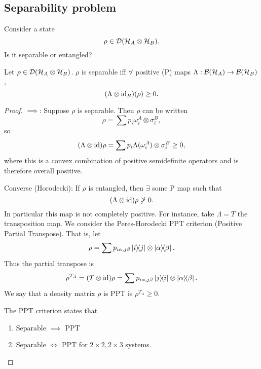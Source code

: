 \subsection*{Separability problem} 
Consider a state
\begin{equation*}
    \rho \in \mathcal{D}(\mathcal H_A\otimes \mathcal H_B).
\end{equation*}
Is it separable or entangled?
\begin{thm}\label{separabilitycriterion}
    Let $\rho \in \mathcal{D}(\mathcal H_A \otimes \mathcal H_B)$. $\rho$ is separable iff $\forall$ positive (P) maps $\Lambda:\mathcal{B}(\mathcal H_A)\to \mathcal{B}(\mathcal H_B)$,
    \begin{equation}
        (\Lambda \otimes \operatorname{id}_B)(\rho)\geq 0.
    \end{equation}
\end{thm}
\begin{proof}
    $\implies$: Suppose $\rho$ is separable. Then $\rho$ can be written
    \begin{equation}
        \rho=\sum p_i \omega_i^A \otimes \sigma_i^B,
    \end{equation}
    so
    \begin{equation}
        (\Lambda \otimes \operatorname{id})\rho = \sum p_i \Lambda(\omega_i^A) \otimes \sigma_i^B \geq 0,
    \end{equation}
    where this is a convex combination of positive semidefinite operators and is therefore overall positive.
    
    Converse (Horodecki): If $\rho$ is entangled, then $\exists$ some P map such that
    \begin{equation}
        (\Lambda \otimes \operatorname{id})\rho \not\geq 0.
    \end{equation}
    In particular this map is not completely positive. For instance, take $\Lambda=T$ the transposition map. We consider the Peres-Horodecki PPT criterion (Positive Partial Transpose). That is, let
    \begin{equation}
         \rho =\sum p_{i\alpha,j\beta} \left\lvert i \middle\rangle\!\middle\langle j \right\rvert \otimes \left\lvert \alpha \middle\rangle\!\middle\langle \beta \right\rvert.
    \end{equation}
    Thus the partial transpose is
    \begin{equation}
        \rho^{T_A}=(T\otimes \operatorname{id})\rho = \sum p_{i\alpha,j\beta} \left\lvert j \middle\rangle\!\middle\langle i \right\rvert \otimes \left\lvert \alpha \middle\rangle\!\middle\langle \beta \right\rvert.
    \end{equation}
    We say that a density matrix $\rho$ is PPT is $\rho^{T_A} \geq 0$.
    
    The PPT criterion states that
    \begin{enumerate}
        \item Separable $\implies$ PPT
        \item Separable $\iff$ PPT for $2\times 2, 2\times 3$ systems. 
    \end{enumerate}
    

\end{proof}
